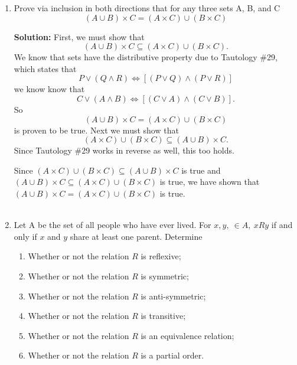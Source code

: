 


 \begin{enumerate}
   \item Prove via inclusion in both directions that for any three 
   sets A, B, and C 
    \[(A \cup B) \times C = (A \times C) \cup (B \times C)\]
    
    \textbf{Solution: }
    First, we must show that \[(A \cup B) \times C \subseteq (A \times C) \cup (B \times C).\] We know that sets have the distributive property due to Tautology \#29, which states that \[P \lor (Q \land R) \iff [(P \lor Q) \land (P \lor R)]\]
    we know know that  \[C \lor (A \land B) \iff [(C \lor A) \land (C \lor B)].\]
    So \[(A \cup B) \times C = (A \times C) \cup (B \times C)\] is proven to be true. Next we must show that \[(A \times C) \cup (B \times C) \subseteq (A \cup B) \times C. \] Since Tautology \#29 works in reverse as well, this too holds.
    
    Since \((A \times C) \cup (B \times C) \subseteq (A \cup B) \times C \) is true and \((A \cup B) \times C \subseteq (A \times C) \cup (B \times C)\) is true, we have shown that \((A \cup B) \times C = (A \times C) \cup (B \times C)\) is true. 
    \\\\
    \item Let A be the set of all people who have ever lived. For \(x, y, \ \in  A, \ xRy\) if and only if \(x\) and \(y\) share at least one parent. Determine 
    \begin{enumerate}
        \item Whether or not the relation \(R\) is reflexive;
        \item Whether or not the relation \(R\) is symmetric;
        \item Whether or not the relation \(R\) is anti-symmetric;
        \item Whether or not the relation \(R\) is transitive;
        \item Whether or not the relation \(R\) is an equivalence relation;
        \item Whether or not the relation \(R\) is a partial order.
        \\\\
    \end{enumerate}
    

\end{enumerate}
